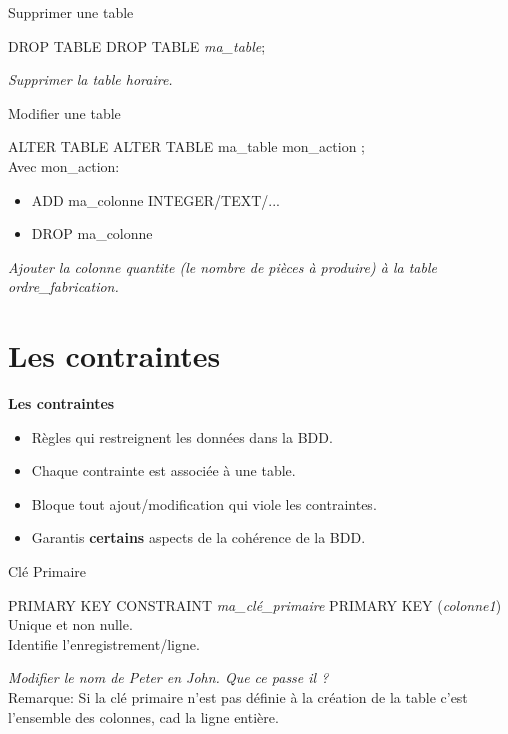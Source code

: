 \documentclass[xetex,dvipsnames]{beamer}
\begin{document}
\begin{frame}{Supprimer une table}
	\begin{alertblock}{DROP TABLE}
	DROP TABLE \textit{ma\_table};
	\end{alertblock}
	\textit{Supprimer la table horaire.}
\end{frame}


\begin{frame}{Modifier une table}
	\begin{alertblock}{ALTER TABLE}
	ALTER TABLE ma\_table mon\_action ;\\
	Avec mon\_action:
	\begin{itemize}
		\item ADD ma\_colonne INTEGER/TEXT/...
		\item DROP ma\_colonne
	\end{itemize}
	\end{alertblock}
	\textit{Ajouter la colonne quantite (le nombre de pièces à produire) à la table ordre\_fabrication. }
\end{frame}




 
\section{Les contraintes}
\begin{frame}
\begin{center}
{\LARGE \textbf{Les contraintes}}
\end{center}
\pause
\begin{itemize}
	\item Règles qui restreignent les données dans la BDD.\\
	\item Chaque contrainte est associée à une table.\\
	\item Bloque tout ajout/modification qui viole les contraintes.
	\item Garantis \textbf{certains} aspects de la cohérence de la BDD.
\end{itemize}
\end{frame}

\begin{frame}{Clé Primaire}
	\begin{alertblock}{PRIMARY KEY}
		CONSTRAINT \textit{ma\_clé\_primaire} PRIMARY KEY (\textit{colonne1})\\
		Unique et non nulle.\\
		Identifie l'enregistrement/ligne.\\
	\end{alertblock}
	
	\textit{Modifier le nom de Peter en John. Que ce passe il ? }\\
\vspace*{1em}
	Remarque: Si la clé primaire n'est pas définie à la création de la table \pause c'est l'ensemble des colonnes, cad la ligne entière.
	
	
\end{frame}
\end{document}
